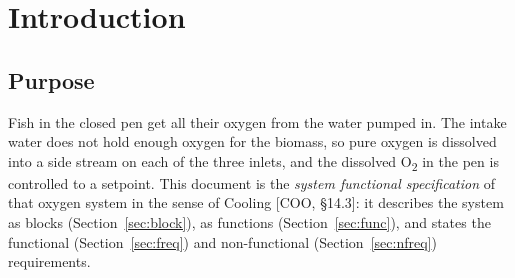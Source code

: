 \documentclass[11pt,a4paper]{article}
\newcommand{\Otwo}{O\textsubscript{2}}
\begin{document}
\maketitle

\begin{abstract}
\noindent This document describes how the oxygen system of the CAS closed pen at Heimdall works,
and how the control system runs it. It is written for the project team, the operators, the
commissioning engineers and the oxygen supplier Normex. It covers every instrument and actuator
of the oxygen system, the control principle, the start and stop sequences, the interlocks, the
alarms and the fault handling, as implemented in the PLC program of 2026-10-21 and as required by
the Norwegian functional description [FD]. Items that are not decided are marked  and listed
in Section~\ref{sec:open}; decisions are marked .
\end{abstract}

\tableofcontents

\section{Introduction}
\label{sec:intro}

\subsection{Purpose}
Fish in the closed pen get all their oxygen from the water pumped in. The intake water does not
hold enough oxygen for the biomass, so pure oxygen is dissolved into a side stream on each of the
three inlets, and the dissolved \Otwo{} in the pen is controlled to a setpoint. This document is
the \emph{system functional specification} of that oxygen system in the sense of Cooling
[COO, \S14.3]: it describes the system as blocks (Section~\ref{sec:block}), as functions
(Section~\ref{sec:func}), and states the functional (Section~\ref{sec:freq}) and non-functional
(Section~\ref{sec:nfreq}) requirements.
\end{document}

